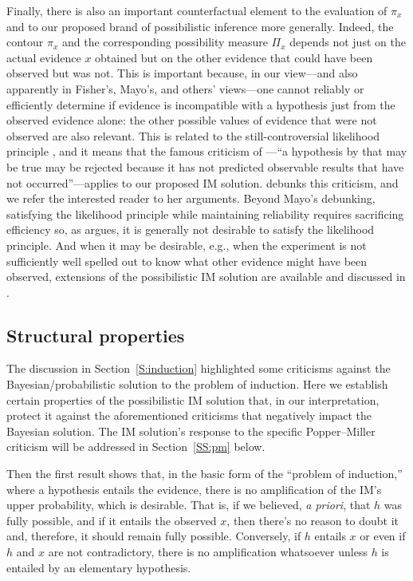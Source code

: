 \documentclass[a4paper, 12pt]{article}
\theoremstyle{plain}
\theoremstyle{definition}
\theoremstyle{remark}
\newcommand{\uPi}{\mathsf{\Pi}}%
\begin{document}
Finally, there is also an important counterfactual element to the evaluation of $\pi_x$ and to our proposed brand of possibilistic inference more generally.  Indeed, the contour $\pi_x$ and the corresponding possibility measure $\uPi_x$ depends not just on the actual evidence $x$ obtained but on the other evidence that could have been observed but was not.  This is important because, in our view---and also apparently in Fisher's, Mayo's, and others' views---one cannot reliably or efficiently determine if evidence is incompatible with a hypothesis just from the observed evidence alone: the other possible values of evidence that were not observed are also relevant.  This is related to the still-controversial likelihood principle \citep[e.g.,][]{birnbaum1962, bergerwolpert1984}, and it means that the famous criticism of \citet[][p.~385]{jeffreys1961}---``a hypothesis by that may be true may be rejected because it has not predicted observable results that have not occurred''---applies to our proposed IM solution.   \citet[][Exhibit~v, p.~168--170]{mayo.book.2018} debunks this criticism, and we refer the interested reader to her arguments.  Beyond Mayo's debunking, satisfying the likelihood principle while maintaining reliability requires sacrificing efficiency so, as \citet{martin.basu} argues, it is generally not desirable to satisfy the likelihood principle.  And when it may be desirable, e.g., when the experiment is not sufficiently well spelled out to know what other evidence might have been observed, extensions of the possibilistic IM solution are available and discussed in \citet[][Sec.~6]{martin.basu}. 



\subsection{Structural properties}

The discussion in Section~\ref{S:induction} 
highlighted some criticisms against the Bayesian/probabilistic solution to the problem of induction.  Here we establish certain properties of the possibilistic IM solution that, in our interpretation, protect it against the aforementioned criticisms that negatively impact the Bayesian solution.  The IM solution's response to the specific Popper--Miller criticism will be addressed in Section~\ref{SS:pm} below.  

Then the first result shows that, in the basic form of the ``problem of induction,'' where a hypothesis entails the evidence, there is no amplification of the IM's upper probability, which is desirable.  That is, if we believed, {\em a priori}, that $h$ was fully possible, and if it entails the observed $x$, then there's no reason to doubt it and, therefore, it should remain fully possible.  Conversely, if $h$ entails $x$ or even if $h$ and $x$ are not contradictory, there is no amplification whatsoever unless $h$ is entailed by an elementary hypothesis. 
\end{document}
